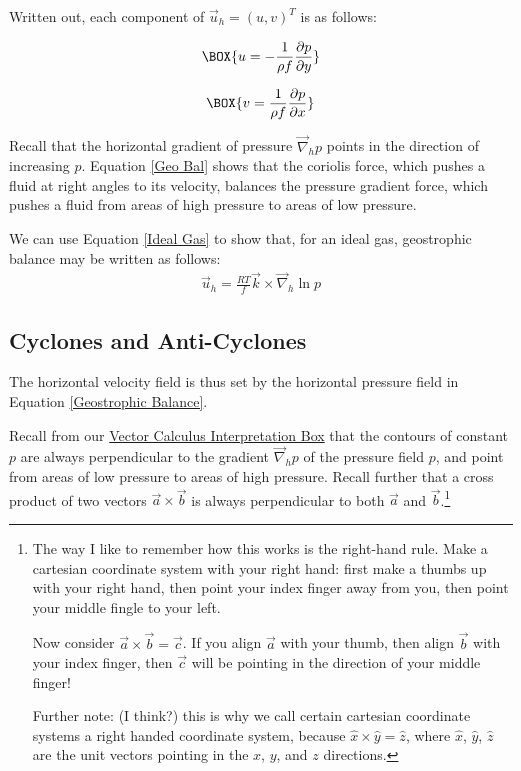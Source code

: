 Written out, each component of $\vec{u}_h=(u,v)^T$ is as follows:

\begin{minipage}{0.45\linewidth}
    \begin{align*}
        \BOX{u = -\frac{1}{\rho f}\frac{\partial p}{\partial y}}
    \end{align*}
\end{minipage}
\hfill
\begin{minipage}{0.45\linewidth}
    \begin{align*}
        \BOX{v = \frac{1}{\rho f}\frac{\partial p}{\partial x}}
    \end{align*}
\end{minipage}

\vspace{2 mm} Recall that the horizontal gradient of pressure $\vec{\nabla}_h p$ points in the direction of increasing $p$. Equation \ref{Geo Bal} shows that the coriolis force, which pushes a fluid at right angles to its velocity, balances the pressure gradient force, which pushes a fluid from areas of high pressure to areas of low pressure.

We can use Equation \ref{Ideal Gas} to show that, for an ideal gas, geostrophic balance may be written as follows:
\begin{align}
    \label{Geostrophic Ideal Gas}
    \vec{u}_h=\frac{RT}{ f}\vec{k}\times\vec{\nabla}_h\ln p
\end{align}

\subsection{Cyclones and Anti-Cyclones}\label{Cyclones}

The horizontal velocity field is thus set by the horizontal pressure field in Equation \ref{Geostrophic Balance}. 

Recall from our \hyperref[VC Interp]{Vector Calculus Interpretation Box} that the contours of constant $p$ are always perpendicular to the gradient $\vec{\nabla}_h p$ of the pressure field $p$, and point from areas of low pressure to areas of high pressure. Recall further that a cross product of two vectors $\vec{a}\times\vec{b}$ is always perpendicular to both $\vec{a}$ and $\vec{b}$.\footnote{
    The way I like to remember how this works is the right-hand rule. Make a cartesian coordinate system with your right hand: first make a thumbs up with your right hand, then point your index finger away from you, then point your middle fingle to your left.

    Now consider $\vec{a}\times\vec{b}=\vec{c}$. If you align $\vec{a}$ with your thumb, then align $\vec{b}$ with your index finger, then $\vec{c}$ will be pointing in the direction of your middle finger!

    Further note: (I think?) this is why we call certain cartesian coordinate systems a right handed coordinate system, because $\hat{x}\times\hat{y}=\hat{z}$, where $\hat{x}$, $\hat{y}$, $\hat{z}$ are the unit vectors pointing in the $x$, $y$, and $z$ directions.
}

